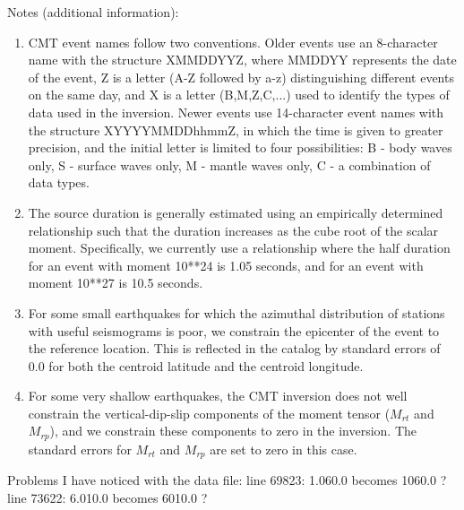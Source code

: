         
Notes (additional information):
\begin{enumerate}
\item CMT event names follow two conventions. Older events use an 8-character 
name with the structure XMMDDYYZ, where MMDDYY represents the date of
the event, Z is a letter (A-Z followed by a-z) distinguishing different 
events on the same day, and X is a letter (B,M,Z,C,...) used to identify 
the types of data used in the inversion. Newer events use 14-character event 
names with the structure XYYYYMMDDhhmmZ, in which the time is given to greater
precision, and the initial letter is limited to four possibilities: B - body 
waves only, S - surface waves only, M - mantle waves only, C - a combination 
of data types.

\item The source duration is generally estimated using an empirically determined
relationship such that the duration increases as the cube root of the scalar
moment. Specifically, we currently use a relationship where the half duration
for an event with moment 10**24 is 1.05 seconds, and for an event with moment
10**27 is 10.5 seconds.

\item For some small earthquakes for which the azimuthal distribution of stations 
with useful seismograms is poor, we constrain the epicenter of the event to
the reference location. This is reflected in the catalog by standard 
errors of 0.0 for both the centroid latitude and the centroid longitude.

\item For some very shallow earthquakes, the CMT inversion does not well 
constrain the vertical-dip-slip components of the moment tensor ($M_{rt}$ and $M_{rp}$),
and we constrain these components to zero in the inversion. The standard
errors for $M_{rt}$ and $M_{rp}$ are set to zero in this case.
\end{enumerate}

\vspace{1cm}

Problems I have noticed with the data file:
line 69823: 1.060.0 becomes 1060.0 ?
line 73622: 6.010.0 becomes 6010.0 ? 


